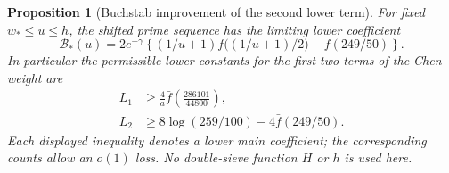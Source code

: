 \documentclass[11pt]{article}
\newtheorem{proposition}[theorem]{Proposition}
\begin{document}
\begin{proposition}[Buchstab improvement of the second lower term]
\label{prop:buchstab-restricted-lower}
For fixed $w_*\le u\le h$, the shifted prime sequence has the
limiting lower coefficient
\begin{equation}\label{eq:buchstab-restricted-coefficient}
 \mathcal B_*(u)
 =2e^{-\gamma}\left\{
    (1/u+1)f\big((1/u+1)/2\big)-f(249/50)\right\}.
\end{equation}
In particular the permissible lower constants for the first
two terms of the Chen weight are
\begin{align}
 L_1&\ge\frac4a\bar f\left(\frac{286101}{44800}\right),
 \label{eq:buchstab-new-L1}\\
 L_2&\ge8\log(259/100)-4\bar f(249/50).
 \label{eq:buchstab-new-L2}
\end{align}
Each displayed inequality denotes a lower main coefficient;
the corresponding counts allow an $o(1)$ loss. No double-sieve
function $H$ or $h$ is used here.
\end{proposition}
\end{document}
